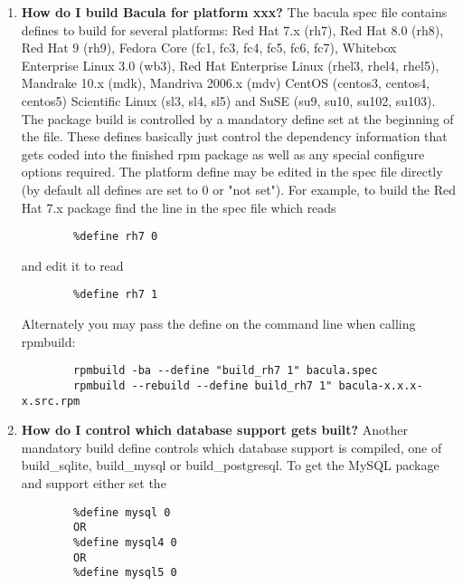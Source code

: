 \begin{enumerate}
\item
   \label{faq1}
   {\bf How do I build Bacula for platform xxx?}
   The bacula spec file contains defines to build for several platforms:
   Red Hat 7.x (rh7), Red Hat 8.0 (rh8), Red Hat 9 (rh9), Fedora Core (fc1,
   fc3, fc4, fc5, fc6, fc7), Whitebox Enterprise Linux 3.0 (wb3), Red Hat Enterprise Linux
   (rhel3, rhel4, rhel5), Mandrake 10.x (mdk), Mandriva 2006.x (mdv) CentOS (centos3, centos4, centos5)
   Scientific Linux (sl3, sl4, sl5) and SuSE (su9, su10, su102, su103). The package build is controlled by a mandatory define set at the beginning of the file.  These defines basically just control the dependency information that gets coded into the finished rpm package as well
   as any special configure options required.  The platform define may be edited
   in the spec file directly (by default all defines are set to 0 or "not set").
   For example, to build the Red Hat 7.x package find the line in the spec file
   which reads

\footnotesize
\begin{verbatim}
        %define rh7 0

\end{verbatim}
\normalsize

and edit it to read

\footnotesize
\begin{verbatim}
        %define rh7 1

\end{verbatim}
\normalsize

Alternately you may pass the define on the command line when calling rpmbuild:


\footnotesize
\begin{verbatim}
        rpmbuild -ba --define "build_rh7 1" bacula.spec
        rpmbuild --rebuild --define build_rh7 1" bacula-x.x.x-x.src.rpm

\end{verbatim}
\normalsize

\item
   \label{faq2}
   {\bf How do I control which database support gets built?}
   Another mandatory build define controls which database support is compiled,
   one of  build\_sqlite, build\_mysql or build\_postgresql. To get the MySQL
   package and support either  set the

\footnotesize
\begin{verbatim}
        %define mysql 0
        OR
        %define mysql4 0
        OR
        %define mysql5 0


\end{verbatim}
\end{enumerate}
